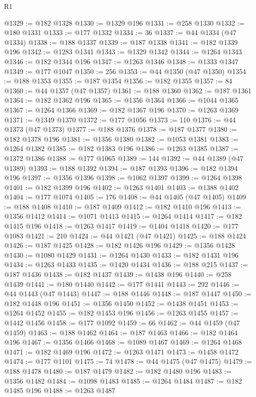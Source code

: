 \begin{lexlean}{R1}
\begin{coremodule}
@1329 := @182 @1328
@1330 := @1329 @196
@1331 := @258 @1330
@1332 := @180 @1331
@1333 := @177 @1332
@1334 := 36
@1337 := @44 @1334 (@47 @1334)
@1338 := @188 @1337
@1339 := @187 @1338
@1341 := @182 @1339 @196
@1342 := @1283 @1341
@1343 := @1329 @1342
@1344 := @1264 @1343
@1346 := @182 @1344 @196
@1347 := @1263 @1346
@1348 := @1333 @1347
@1349 := @177 @1047
@1350 := 256
@1353 := @44 @1350 (@47 @1350)
@1354 := @188 @1353
@1355 := @187 @1354
@1356 := @182 @1355
@1357 := 84
@1360 := @44 @1357 (@47 @1357)
@1361 := @188 @1360
@1362 := @187 @1361
@1364 := @182 @1362 @196
@1365 := @1356 @1364
@1366 := @1044 @1365
@1367 := @1264 @1366
@1369 := @182 @1367 @196
@1370 := @1263 @1369
@1371 := @1349 @1370
@1372 := @177 @1056
@1373 := 110
@1376 := @44 @1373 (@47 @1373)
@1377 := @188 @1376
@1378 := @187 @1377
@1380 := @182 @1378 @196
@1381 := @1356 @1380
@1382 := @1053 @1381
@1383 := @1264 @1382
@1385 := @182 @1383 @196
@1386 := @1263 @1385
@1387 := @1372 @1386
@1388 := @177 @1065
@1389 := 144
@1392 := @44 @1389 (@47 @1389)
@1393 := @188 @1392
@1394 := @187 @1393
@1396 := @182 @1394 @196
@1397 := @1356 @1396
@1398 := @1062 @1397
@1399 := @1264 @1398
@1401 := @182 @1399 @196
@1402 := @1263 @1401
@1403 := @1388 @1402
@1404 := @177 @1074
@1405 := 176
@1408 := @44 @1405 (@47 @1405)
@1409 := @188 @1408
@1410 := @187 @1409
@1412 := @182 @1410 @196
@1413 := @1356 @1412
@1414 := @1071 @1413
@1415 := @1264 @1414
@1417 := @182 @1415 @196
@1418 := @1263 @1417
@1419 := @1404 @1418
@1420 := @177 @1083
@1421 := 210
@1424 := @44 @1421 (@47 @1421)
@1425 := @188 @1424
@1426 := @187 @1425
@1428 := @182 @1426 @196
@1429 := @1356 @1428
@1430 := @1080 @1429
@1431 := @1264 @1430
@1433 := @182 @1431 @196
@1434 := @1263 @1433
@1435 := @1420 @1434
@1436 := @188 @215
@1437 := @187 @1436
@1438 := @182 @1437
@1439 := @1438 @196
@1440 := @258 @1439
@1441 := @180 @1440
@1442 := @177 @1441
@1443 := 292
@1446 := @44 @1443 (@47 @1443)
@1447 := @188 @1446
@1448 := @187 @1447
@1450 := @182 @1448 @196
@1451 := @1356 @1450
@1452 := @1438 @1451
@1453 := @1264 @1452
@1455 := @182 @1453 @196
@1456 := @1263 @1455
@1457 := @1442 @1456
@1458 := @177 @1092
@1459 := 66
@1462 := @44 @1459 (@47 @1459)
@1463 := @188 @1462
@1464 := @187 @1463
@1466 := @182 @1464 @196
@1467 := @1356 @1466
@1468 := @1089 @1467
@1469 := @1264 @1468
@1471 := @182 @1469 @196
@1472 := @1263 @1471
@1473 := @1458 @1472
@1474 := @177 @1101
@1475 := 74
@1478 := @44 @1475 (@47 @1475)
@1479 := @188 @1478
@1480 := @187 @1479
@1482 := @182 @1480 @196
@1483 := @1356 @1482
@1484 := @1098 @1483
@1485 := @1264 @1484
@1487 := @182 @1485 @196
@1488 := @1263 @1487

\end{coremodule}
\end{lexlean}

